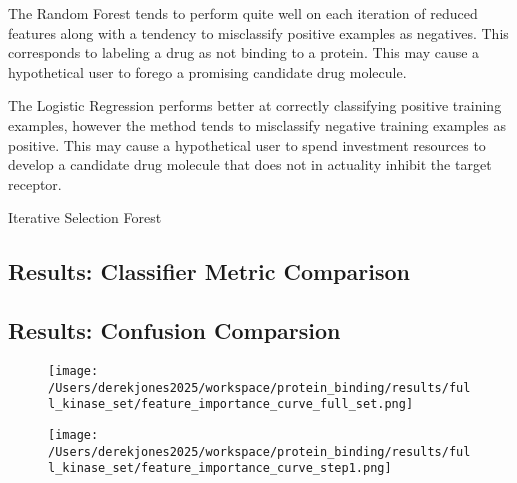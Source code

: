 \documentclass{article}
\makeatletter
\def\BState{\State\hskip-\ALG@thistlm}
\makeatother
\begin{document}
The Random Forest tends to perform quite well on each iteration of reduced features along with a tendency to misclassify positive examples as negatives. This corresponds to labeling a drug as not binding to a protein. This may cause a hypothetical user to forego a promising candidate drug molecule.

The Logistic Regression performs better at correctly classifying positive training examples, however the method tends to misclassify negative training examples as positive. This may cause a hypothetical user to spend investment resources to develop a candidate drug molecule that does not in actuality inhibit the target receptor.


\begin{algorithm}
\caption{Iterative Selection Forest}\label{euclid}
\end{algorithm}


\subsection{Results: Classifier Metric Comparison}

\subsection{Results: Confusion Comparsion}
   
\begin{center}
\begin{figure}[htpb!]
\texttt{[image: /Users/derekjones2025/workspace/protein\_binding/results/full\_kinase\_set/feature\_importance\_curve\_full\_set.png]}
\end{figure}
\end{center}

\begin{center}
\begin{figure}[htpb!]
\texttt{[image: /Users/derekjones2025/workspace/protein\_binding/results/full\_kinase\_set/feature\_importance\_curve\_step1.png]}
\end{figure}
\end{center}
\end{document}
